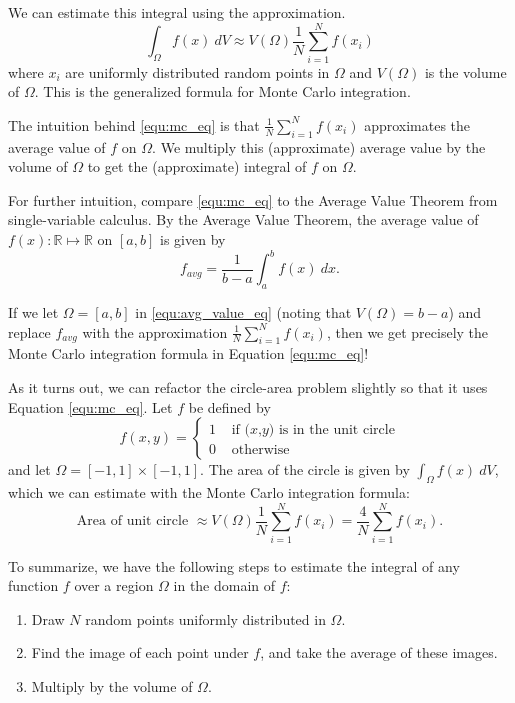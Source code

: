 We can estimate this integral using the approximation.
\begin{equation}\label{equ:mc_eq}
\int_\Omega f(x)\:dV \approx V(\Omega) \frac{1}{N} \sum_{i=1}^N f(x_i)
\end{equation}
where $x_i$ are uniformly distributed random points in $\Omega$ and $V(\Omega)$ is the volume of $\Omega$.
This is the generalized formula for Monte Carlo integration. 

The intuition behind \eqref{equ:mc_eq} is that $\frac{1}{N} \sum_{i=1}^N f(x_i)$ approximates the average value of $f$ on $\Omega$.
We multiply this (approximate) average value by the volume of $\Omega$ to get the (approximate) integral of $f$ on $\Omega$.

For further intuition, compare \eqref{equ:mc_eq} to the Average Value Theorem from single-variable calculus. 
By the Average Value Theorem, the average value of $f(x) : \mathbb{R} \mapsto \mathbb{R} $ on ${[a,b]}$ is given by
\begin{equation}\label{equ:avg_value_eq}
f_{avg} = \frac{1}{b-a}\int_a^b f(x)\:dx.
\end{equation}

If we let $\Omega = {[a,b]}$ in \eqref{equ:avg_value_eq} (noting that $V(\Omega) = b - a$) and replace $f_{avg}$ with the approximation $\frac{1}{N} \sum_{i=1}^N f(x_i)$, then we get precisely the Monte Carlo integration formula in Equation \eqref{equ:mc_eq}!

As it turns out, we can refactor the circle-area problem slightly so that it uses Equation \eqref{equ:mc_eq}. 
Let $f$ be defined by 
$$f(x,y) = \begin{cases} 1 &\mbox{ if $(x$,$y)$ is in the unit circle} \\ 0 &\mbox{ otherwise} \end{cases}$$
and let $\Omega =   {[-1,1]} \times {[-1,1]}$.
The area of the circle is given by 
$\int_\Omega f(x)\:dV$,
which we can estimate with the Monte Carlo integration formula:
\[
\mbox{Area of unit circle } \approx V(\Omega) \frac{1}{N} \sum_{i=1}^N f(x_i) = \frac{4}{N} \sum_{i=1}^N f(x_i).
\]


To summarize, we have the following steps to estimate the integral of any function $f$ over a region $\Omega$ in the domain of $f$:
\begin{enumerate}
\item Draw $N$ random points uniformly distributed in $\Omega$.
\item Find the image of each point under $f$, and take the average of these images.
\item Multiply by the volume of $\Omega$.
\end{enumerate}


